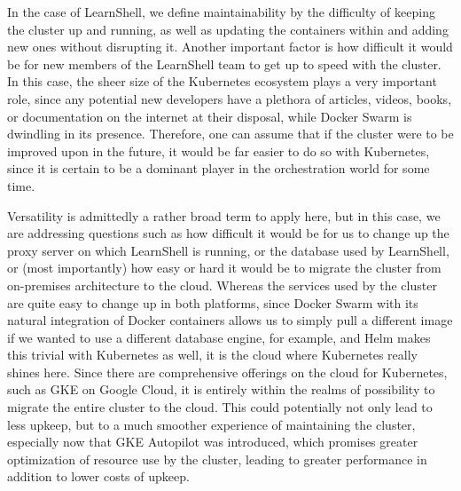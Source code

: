 \documentclass[thesis=B,english]{FITthesis}[2019/12/23]
\begin{document}
In the case of LearnShell, we define maintainability by the difficulty of keeping the cluster up and running, as well as updating the containers within and adding new ones without disrupting it. Another important factor is how difficult it would be for new members of the LearnShell team to get up to speed with the cluster. In this case, the sheer size of the Kubernetes ecosystem plays a very important role, since any potential new developers have a plethora of articles, videos, books, or documentation on the internet at their disposal, while Docker Swarm is dwindling in its presence. Therefore, one can assume that if the cluster were to be improved upon in the future, it would be far easier to do so with Kubernetes, since it is certain to be a dominant player in the orchestration world for some time.

Versatility is admittedly a rather broad term to apply here, but in this case, we are addressing questions such as how difficult it would be for us to change up the proxy server on which LearnShell is running, or the database used by LearnShell, or (most importantly) how easy or hard it would be to migrate the cluster from on-premises architecture to the cloud. Whereas the services used by the cluster are quite easy to change up in both platforms, since Docker Swarm with its natural integration of Docker containers allows us to simply pull a different image if we wanted to use a different database engine, for example, and Helm makes this trivial with Kubernetes as well, it is the cloud where Kubernetes really shines here. Since there are comprehensive offerings on the cloud for Kubernetes, such as GKE on Google Cloud, it is entirely within the realms of possibility to migrate the entire cluster to the cloud. This could potentially not only lead to less upkeep, but to a much smoother experience of maintaining the cluster, especially now that GKE Autopilot was introduced, which promises greater optimization of resource use by the cluster, leading to greater performance in addition to lower costs of upkeep. \cite{autopilot}
\end{document}

